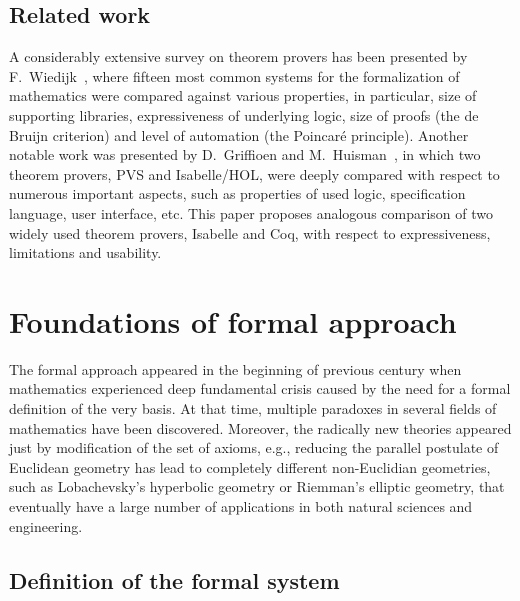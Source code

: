 \documentclass[article]{aaltoseries}
\begin{document}


\subsection{Related work}
A considerably extensive survey on theorem provers has been presented by F.~Wiedijk~\cite{Wie03}, where fifteen most common systems for the formalization of mathematics were compared against various properties, in particular, size of supporting libraries, expressiveness of underlying logic, size of proofs (the de Bruijn criterion) and level of automation (the Poincaré principle). 
Another notable work was presented by D.~Griffioen and M.~Huisman~\cite{Griff98}, in which two theorem provers, PVS and Isabelle/HOL, were deeply compared with respect to numerous important aspects, such as properties of used logic, specification language, user interface, etc. This paper proposes analogous comparison of two widely used theorem provers, Isabelle and Coq, with respect to expressiveness, limitations and usability.




\section{Foundations of formal approach}
\label{sec:formal_theory}

The formal approach appeared in the beginning of previous century when mathematics experienced deep fundamental crisis caused by the need for a formal definition of the very basis. At that time, multiple paradoxes in several fields of mathematics have been discovered. Moreover, the radically new theories appeared just by modification of the set of axioms, e.g., reducing the parallel postulate of Euclidean geometry has lead to completely different non-Euclidian geometries, such as Lobachevsky's hyperbolic geometry or Riemman's elliptic geometry, that eventually have a large number of applications in both natural sciences and engineering.


\subsection{Definition of the formal system}
\label{sec:definitions}

\end{document}
